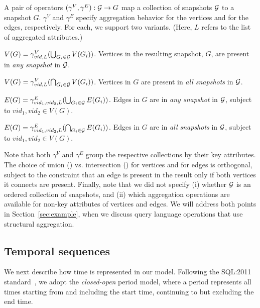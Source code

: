 \begin{definition}   
A pair of operators $(\gamma^{V}, \gamma^{E}) : {\cal G} \rightarrow
G$ map a collection of snapshots $\cal{G}$ to a snapshot $G$.
$\gamma^{V}$ and $\gamma^{E}$ specify aggregation behavior for the
vertices and for the edges, respectively.  For each, we support two
variants. (Here, $L$ refers to the list of aggregated attributes.)

\insql{[Any V]} $V(G) = \gamma^{V}_{vid, L}(\bigcup_{G_i \in {\cal G}} V(G_i))$.
Vertices in the resulting snapshot, $G$, are present in {\em any
  snapshot} in ${\cal G}$.

\insql{[All V]} $V(G) = \gamma^{V}_{vid, L}(\bigcap_{G_i \in {\cal G}} V(G_i))$.
Vertices in $G$ are present in {\em all snapshots} in ${\cal G}$.

\insql{[Any E]} $E(G) = \gamma^{E}_{vid_1,vid_2, L}(\bigcup_{G_i \in {\cal G}} E(G_i))$.
  Edges in $G$ are in {\em any snapshot} in ${\cal G}$,
  subject to $vid_1, vid_2 \in V(G)$.

\insql{[All E]} $E(G) = \gamma^{E}_{vid_1,vid_2, L}(\bigcap_{G_i \in
  {\cal G}} E(G_i))$.  Edges in $G$ are in {\em all snapshots} in
${\cal G}$, subject to $vid_1, vid_2 \in V(G)$.

\label{def:sgroup}
\end{definition}

Note that both $\gamma^{V}$ and $\gamma^{E}$ group the respective
collections by their key attributes.  The choice of union
() vs. intersection () for vertices and for
edges is orthogonal, subject to the constraint that an edge is present
in the result only if both vertices it connects are present.  Finally,
note that we did not specify (i) whether ${\cal G}$ is an ordered
collection of snapshots, and (ii) which aggregation operations are
available for non-key attributes of vertices and edges.  We will
address both points in Section~\ref{sec:example}, when we discuss
query language operations that use structural aggregation.

\subsection{Temporal sequences}
\label{sec:model:time}

We next describe how time is represented in our model.  Following the
SQL:2011 standard~\cite{DBLP:journals/sigmod/KulkarniM12}, we adopt
the {\em closed-open} period model, where a period represents all
times starting from and including the start time, continuing to but
excluding the end time.

